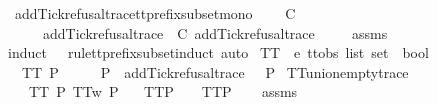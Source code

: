 \begin{isabellebody}
\endisatagproof
{\isafoldproof}%
%
\isadelimproof
\isanewline
%
\endisadelimproof
\isanewline
{}\isamarkupfalse%
\ add{\isacharunderscore}Tick{\isacharunderscore}refusal{\isacharunderscore}trace{\isacharunderscore}tt{\isacharunderscore}prefix{\isacharunderscore}subset{\isacharunderscore}mono{\isacharcolon}\isanewline
\ \ \ {\isachardoublequoteopen}{\isasymrho}\ {\isasymlesssim}\isactrlsub C\ {\isasymsigma}{\isachardoublequoteclose}\isanewline
\ \ \ \ \ {\isachardoublequoteopen}add{\isacharunderscore}Tick{\isacharunderscore}refusal{\isacharunderscore}trace\ {\isasymrho}\ {\isasymlesssim}\isactrlsub C\ add{\isacharunderscore}Tick{\isacharunderscore}refusal{\isacharunderscore}trace\ {\isasymsigma}{\isachardoublequoteclose}\isanewline
%
\isadelimproof
\ \ %
\endisadelimproof
%
\isatagproof
{}\isamarkupfalse%
\ assms\ \isamarkupfalse%
{\isacharparenleft}induct\ {\isasymrho}\ {\isasymsigma}\ rule{\isacharcolon}tt{\isacharunderscore}prefix{\isacharunderscore}subset{\isachardot}induct{\isacharcomma}\ auto{\isacharparenright}%
\endisatagproof
{\isafoldproof}%
%
\isadelimproof
\isanewline
%
\endisadelimproof
\isanewline
{}\isamarkupfalse%
\ TT{}\ {\isacharcolon}{\isacharcolon}\ {\isachardoublequoteopen}{\isacharprime}e\ ttobs\ list\ set\ {\isasymRightarrow}\ bool{\isachardoublequoteclose}\ \isanewline
\ \ {\isachardoublequoteopen}TT{}\ P\ {\isacharequal}\ {\isacharparenleft}{\isasymforall}\ {\isasymrho}{\isachardot}\ {\isasymrho}\ {\isasymin}\ P\ {\isasymlongrightarrow}\ add{\isacharunderscore}Tick{\isacharunderscore}refusal{\isacharunderscore}trace\ {\isasymrho}\ {\isasymin}\ P{\isacharparenright}{\isachardoublequoteclose}\isanewline
\isanewline
{}\isamarkupfalse%
\ TT{}{\isacharunderscore}union{\isacharunderscore}empty{\isacharunderscore}trace{\isacharcolon}\isanewline
\ \ \ {\isachardoublequoteopen}TT{}\ P{\isachardoublequoteclose}\ {\isachardoublequoteopen}TT{}w\ P{\isachardoublequoteclose}\isanewline
\ \ \ {\isachardoublequoteopen}TT{}{\isacharparenleft}P\ {\isasymunion}\ {\isacharbraceleft}{\isacharbrackleft}{\isacharbrackright}{\isacharbraceright}{\isacharparenright}\ {\isacharequal}\ TT{}{\isacharparenleft}P{\isacharparenright}{\isachardoublequoteclose}\isanewline
%
\isadelimproof
\ \ %
\endisadelimproof
%
\isatagproof
{}\isamarkupfalse%
\ assms\ \isamarkupfalse%

\end{isabellebody}
